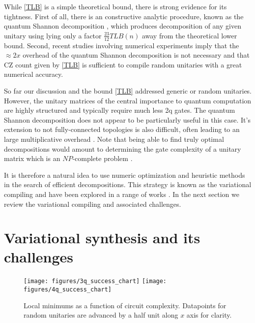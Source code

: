 \documentclass[draft, amsfonts, amssymb, aps, nofootinbib, twocolumn]{revtex4-2}
\newcommand{\CZ}{CZ }
\begin{document}
While \eqref{TLB} is a simple theoretical bound, there is strong evidence for its tightness. First of all, there is an constructive analytic procedure, known as the quantum Shannon decomposition \cite{Shende2006}, which produces decomposition of any given unitary using lying only a factor $\frac{23}{12}TLB(n)$ away from the theoretical lower bound. Second, recent studies involving numerical experiments \cite{Madden2021, Rakyta2021} imply that the $\approx2x$ overhead of the quantum Shannon decomposition is not necessary and that \CZ count given by \eqref{TLB} is sufficient to compile random unitaries with a great numerical accuracy.

So far our discussion and the bound \eqref{TLB} addressed generic or random unitaries. However, the unitary matrices of the central importance to quantum computation are highly structured and typically require much less 2q gates. The quantum Shannon decomposition does not appear to be particularly useful in this case. It's extension to not fully-connected topologies is also difficult, often leading to an large multiplicative overhead \cite{Shende2006}. Note that being able to find truly optimal decompositions would amount to determining the gate complexity of a unitary matrix which is an $NP$-complete problem \cite{Botea2018}.

It is therefore a natural idea to use numeric optimization and heuristic methods in the search of efficient decompositions. This strategy is known as the variational compiling and have been explored in a range of works \cite{}. In the next section we review the variational compiling and associated challenges.

\section{Variational synthesis and its challenges}

\begin{figure*}
	\texttt{[image: figures/3q\_success\_chart]}
	\texttt{[image: figures/4q\_success\_chart]}
	\caption{Local minimums as a function of circuit complexity. Datapoints for random unitaries are advanced by a half unit along $x$ axis for clarity.}
	\label{fig local minumums}
\end{figure*}
\end{document}
